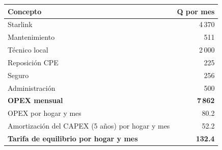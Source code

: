 \begin{tabular}{lr}\toprule Concepto & Q por mes\\\midrule
Starlink & 4\,370\\
Mantenimiento & 511\\
Técnico local & 2\,000\\
Reposición CPE & 225\\
Seguro & 256\\
Administración & 500\\
\midrule \textbf{OPEX mensual} & \textbf{7\,862}\\ OPEX por hogar y mes & 80.2\\ Amortización del CAPEX (5 años) por hogar y mes & 52.2\\ \textbf{Tarifa de equilibrio por hogar y mes} & \textbf{132.4}\\
\bottomrule\end{tabular}
